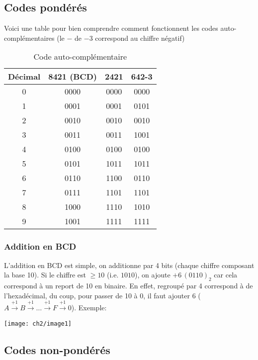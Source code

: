 \subsection{Codes pondérés}
Voici une table pour bien comprendre comment fonctionnent les codes auto-complémentaires (le $-$ de $-3$ correspond au chiffre négatif)
\begin{table}[H]
	\centering
	\begin{tabular}{c|c|c|c}
		Décimal & 8421 (BCD) & 2421 & 642-3 \\
		\hline
		0 & 0000 & 0000 & 0000\\
		\hline
		1 & 0001 & 0001 & 0101\\
		\hline
		2 & 0010 & 0010 & 0010\\
		\hline
		3 & 0011 & 0011 & 1001\\
		\hline
		4 & 0100 & 0100 & 0100\\
		\hline
		5 & 0101 & 1011 & 1011\\
		\hline
		6 & 0110 & 1100 & 0110\\
		\hline
		7 & 0111 & 1101 & 1101\\
		\hline
		8 & 1000 & 1110 & 1010\\
		\hline
		9 & 1001 & 1111 & 1111		
	\end{tabular}
	\caption{Code auto-complémentaire}
\end{table}
\subsubsection{Addition en BCD}
L'addition en BCD est simple, on additionne par 4 bits (chaque chiffre composant la base 10). Si le chiffre est $\geq 10$ (i.e. $1010$), on ajoute $+6\,(0110)_2$ car cela correspond à un report de 10 en binaire. En effet, regroupé par 4 correspond à de l'hexadécimal, du coup, pour passer de 10 à 0, il faut ajouter 6 ($A\overset{+1}{\rightarrow}B\overset{+1}{\rightarrow}\dots\overset{+1}{\rightarrow}F\overset{+1}{\rightarrow}0$). Exemple:
\begin{table}[H]
	\centering
	\texttt{[image: ch2/image1]}
\end{table}
\subsection{Codes non-pondérés}
